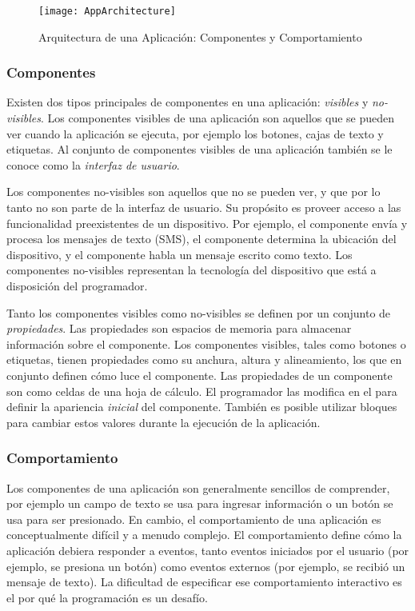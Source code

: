 \begin{figure}[H]
\centering
\texttt{[image: AppArchitecture]}
\caption{Arquitectura de una Aplicación: Componentes y Comportamiento}
\label{fig:appArchitecture}
\end{figure}

\subsubsection*{Componentes}

Existen dos tipos principales de componentes en una aplicación:
\emph{visibles} y \emph{no-visibles}. Los componentes visibles de una
aplicación son aquellos que se pueden ver cuando la aplicación se
ejecuta, por ejemplo los botones, cajas de texto y etiquetas. Al
conjunto de componentes visibles de una aplicación también se le
conoce como la \emph{interfaz de usuario}.

Los componentes no-visibles son aquellos que no se pueden ver, y que
por lo tanto no son parte de la interfaz de usuario. Su propósito es
proveer acceso a las funcionalidad preexistentes de un
dispositivo. Por ejemplo, el componente  envía
y procesa los mensajes de texto (SMS), el componente
 determina la ubicación del dispositivo,
y el componente  habla un mensaje escrito como
texto. Los componentes no-visibles representan la tecnología del
dispositivo que está a disposición del programador.

Tanto los componentes visibles como no-visibles se definen por un
conjunto de \emph{propiedades}. Las propiedades son espacios de
memoria para almacenar información sobre el componente. Los
componentes visibles, tales como botones o etiquetas, tienen
propiedades como su anchura, altura y alineamiento, los que en
conjunto definen cómo luce el componente.
%
Las propiedades de un componente son como celdas de una hoja de
cálculo. El programador las modifica en el \componentDesigner para
definir la apariencia \emph{inicial} del componente. También es
posible utilizar bloques para cambiar estos valores durante la
ejecución de la aplicación.

\subsubsection*{Comportamiento}

Los componentes de una aplicación son generalmente sencillos de
comprender, por ejemplo un campo de texto se usa para ingresar
información o un botón se usa para ser presionado. En cambio, el
comportamiento de una aplicación es conceptualmente difícil y a menudo
complejo. El comportamiento define cómo la aplicación debiera
responder a eventos, tanto eventos iniciados por el usuario (por
ejemplo, se presiona un botón) como eventos externos (por ejemplo, se
recibió un mensaje de texto). La dificultad de especificar ese
comportamiento interactivo es el por qué la programación es un
desafío.

